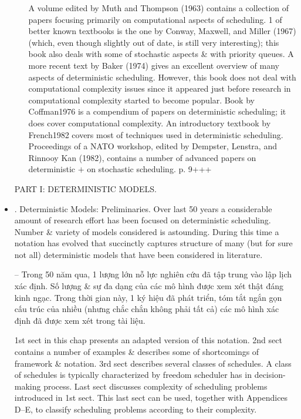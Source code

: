 \documentclass{article}
\begin{document}
\begin{itemize}
\begin{itemize}
        A volume edited by Muth and Thompson (1963) contains a collection of papers focusing primarily on computational aspects of scheduling. 1 of better known textbooks is the one by Conway, Maxwell, and Miller (1967) (which, even though slightly out of date, is still very interesting); this book also deals with some of stochastic aspects \& with priority queues. A more recent text by Baker (1974) gives an excellent overview of many aspects of deterministic scheduling. However, this book does not deal with computational complexity issues since it appeared just before research in computational complexity started to become popular. Book by Coffman1976 is a compendium of papers on deterministic scheduling; it does cover computational complexity. An introductory textbook by French1982 covers most of techniques used in deterministic scheduling. Proceedings of a NATO workshop, edited by Dempster, Lenstra, and Rinnooy Kan (1982), contains a number of advanced papers on deterministic $+$ on stochastic scheduling. p. 9+++
    \end{itemize}
    PART I: DETERMINISTIC MODELS.
    \item {. Deterministic Models: Preliminaries.} Over last 50 years a considerable amount of research effort has been focused on deterministic scheduling. Number \& variety of models considered is astounding. During this time a notation has evolved that succinctly captures structure of many (but for sure not all) deterministic models that have been considered in literature.

    -- Trong 50 năm qua, 1 lượng lớn nỗ lực nghiên cứu đã tập trung vào lập lịch xác định. Số lượng \& sự đa dạng của các mô hình được xem xét thật đáng kinh ngạc. Trong thời gian này, 1 ký hiệu đã phát triển, tóm tắt ngắn gọn cấu trúc của nhiều (nhưng chắc chắn không phải tất cả) các mô hình xác định đã được xem xét trong tài liệu.

    1st sect in this chap presents an adapted version of this notation. 2nd sect contains a number of examples \& describes some of shortcomings of framework \& notation. 3rd sect describes several classes of schedules. A class of schedules is typically characterized by freedom scheduler has in decision-making process. Last sect discusses complexity of scheduling problems introduced in 1st sect. This last sect can be used, together with Appendices D--E, to classify scheduling problems according to their complexity.


\end{itemize}
\end{document}
